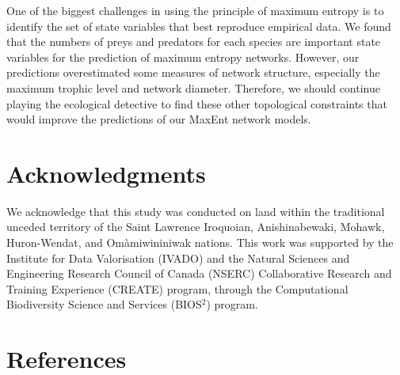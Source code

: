 \documentclass[10pt,oneside]{article}
\begin{document}
One of the biggest challenges in using the principle of maximum entropy
is to identify the set of state variables that best reproduce empirical
data. We found that the numbers of preys and predators for each species
are important state variables for the prediction of maximum entropy
networks. However, our predictions overestimated some measures of
network structure, especially the maximum trophic level and network
diameter. Therefore, we should continue playing the ecological detective
to find these other topological constraints that would improve the
predictions of our MaxEnt network models.

\hypertarget{acknowledgments}{%
\section{Acknowledgments}\label{acknowledgments}}

We acknowledge that this study was conducted on land within the
traditional unceded territory of the Saint Lawrence Iroquoian,
Anishinabewaki, Mohawk, Huron-Wendat, and Omàmiwininiwak nations. This
work was supported by the Institute for Data Valorisation (IVADO) and
the Natural Sciences and Engineering Research Council of Canada (NSERC)
Collaborative Research and Training Experience (CREATE) program, through
the Computational Biodiversity Science and Services (BIOS\(^2\))
program.

\hypertarget{references}{%
\section*{References}\label{references}}
\end{document}
